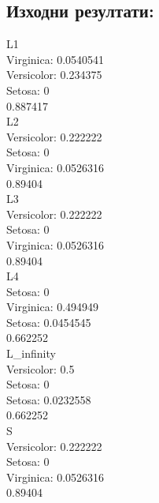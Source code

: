 \documentclass[a4paper, 12pt]{article}
\begin{document}
\subsection{Изходни резултати:}
L1\\
Virginica: 0.0540541\\
Versicolor: 0.234375\\
Setosa: 0\\
0.887417\\
L2\\
Versicolor: 0.222222\\
Setosa: 0\\
Virginica: 0.0526316\\
0.89404\\
L3\\
Versicolor: 0.222222\\
Setosa: 0\\
Virginica: 0.0526316\\
0.89404\\
L4\\
Setosa: 0\\
Virginica: 0.494949\\
Setosa: 0.0454545\\
0.662252\\
L\_infinity\\
Versicolor: 0.5\\
Setosa: 0\\
Setosa: 0.0232558\\
0.662252\\
S\\
Versicolor: 0.222222\\
Setosa: 0\\
Virginica: 0.0526316\\
0.89404
\end{document}
